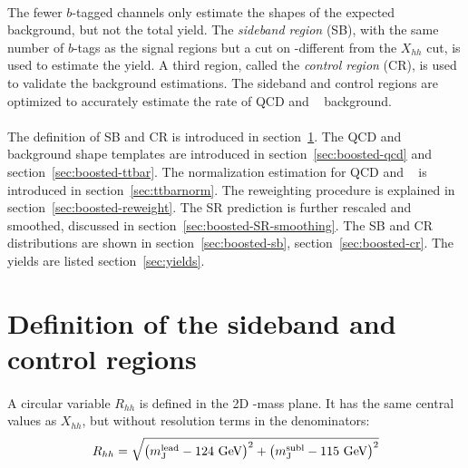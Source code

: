 \paragraph{}
The fewer $b$-tagged channels only estimate the shapes of the expected background, but not the total yield.
The \textit{sideband region} (SB), with the same number of $b$-tags as the signal regions but a cut on \mleadJ-\msublJ different from the $X_{hh}$ cut, is used to estimate the yield.
A third region, called the \textit{control region} (CR), is used to validate the background estimations.
The sideband and control regions are optimized to accurately estimate the rate of QCD and \ttbar~ background. 

\paragraph{}
The definition of SB and CR is introduced in section~\ref{sec:boosted-SBCR}.
The QCD and \ttbar~ background shape templates are introduced in section~\ref{sec:boosted-qcd} and section~\ref{sec:boosted-ttbar}.
The normalization estimation for QCD and \ttbar~ is introduced in section~\ref{sec:ttbarnorm}.
The reweighting procedure is explained in section~\ref{sec:boosted-reweight}.
The SR prediction is further rescaled and smoothed, discussed in section~\ref{sec:boosted-SR-smoothing}.
The SB and CR distributions are shown in section~\ref{sec:boosted-sb}, section~\ref{sec:boosted-cr}. 
The yields are listed section~\ref{sec:yields}.


\section{Definition of the sideband and control regions}
\label{sec:boosted-SBCR}

\paragraph{}
A circular variable $R_{hh}$ is defined in the 2D \mleadJ-\msublJ mass plane. 
It has the same central values as $X_{hh}$, but without resolution terms in the denominators:
\begin{equation}
\label{eq:boosted_RhhDef}
R_{hh} = \sqrt{\left(m^{\rm lead}_{\rm J} - \text{124 GeV}\right)^2 + \left(m^{\rm subl}_{\rm J} - \text{115 GeV}\right)^2}
\end{equation}

